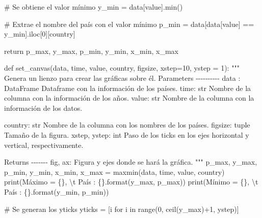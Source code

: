 \documentclass[
  letterpaper,
  DIV=11,
  numbers=noendperiod]{scrreprt}
\newenvironment{Shaded}{\begin{snugshade}}{\end{snugshade}}
\newcommand{\BuiltInTok}[1]{\textcolor[rgb]{0.00,0.23,0.31}{#1}}
\newcommand{\CharTok}[1]{\textcolor[rgb]{0.13,0.47,0.30}{#1}}
\newcommand{\CommentTok}[1]{\textcolor[rgb]{0.37,0.37,0.37}{#1}}
\newcommand{\ControlFlowTok}[1]{\textcolor[rgb]{0.00,0.23,0.31}{#1}}
\newcommand{\DecValTok}[1]{\textcolor[rgb]{0.68,0.00,0.00}{#1}}
\newcommand{\KeywordTok}[1]{\textcolor[rgb]{0.00,0.23,0.31}{#1}}
\newcommand{\NormalTok}[1]{\textcolor[rgb]{0.00,0.23,0.31}{#1}}
\newcommand{\OperatorTok}[1]{\textcolor[rgb]{0.37,0.37,0.37}{#1}}
\newcommand{\SpecialCharTok}[1]{\textcolor[rgb]{0.37,0.37,0.37}{#1}}
\newcommand{\StringTok}[1]{\textcolor[rgb]{0.13,0.47,0.30}{#1}}
\begin{document}
\begin{Shaded}
\begin{Highlighting}[]
    \CommentTok{\# Se obtiene el valor mínimo}
\NormalTok{    y\_min }\OperatorTok{=}\NormalTok{ data[value].}\BuiltInTok{min}\NormalTok{() }

    \CommentTok{\# Extrae el nombre del país con el valor mínimo}
\NormalTok{    p\_min }\OperatorTok{=}\NormalTok{ data[data[value] }\OperatorTok{==}\NormalTok{ y\_min].iloc[}\DecValTok{0}\NormalTok{][country]}

    \ControlFlowTok{return}\NormalTok{ p\_max, y\_max, p\_min, y\_min, x\_min, x\_max}

\KeywordTok{def}\NormalTok{ set\_canvas(data, time, value, country, figsize, xstep}\OperatorTok{=}\DecValTok{10}\NormalTok{, ystep }\OperatorTok{=} \DecValTok{1}\NormalTok{):}
    \CommentTok{"""}
\CommentTok{    Genera un lienzo para crear las gráficas sobre él.}
\CommentTok{    }
\CommentTok{    Parameters}
\CommentTok{    {-}{-}{-}{-}{-}{-}{-}{-}{-}{-}}
\CommentTok{    data : DataFrame}
\CommentTok{        Dataframe con la información de los países.}
\CommentTok{        }
\CommentTok{    time: str}
\CommentTok{        Nombre de la columna con la información de los años.}
\CommentTok{        }
\CommentTok{    value: str}
\CommentTok{        Nombre de la columna con la información de los datos.}

\CommentTok{    country: str}
\CommentTok{        Nombre de la columna con los nombres de los países.}
\CommentTok{        }
\CommentTok{    figsize: tuple}
\CommentTok{        Tamaño de la figura.}
\CommentTok{        }
\CommentTok{    xstep, ystep: int}
\CommentTok{        Paso de los ticks en los ejes horizontal y vertical, respectivamente.}

\CommentTok{    Returns}
\CommentTok{    {-}{-}{-}{-}{-}{-}{-}}
\CommentTok{    fig, ax: }
\CommentTok{        Figura y ejes donde se hará la gráfica.}
\CommentTok{    """}    
\NormalTok{    p\_max, y\_max, p\_min, y\_min, x\_min, x\_max }\OperatorTok{=}\NormalTok{ maxmin(data, time, value, country)}
    \BuiltInTok{print}\NormalTok{(}\StringTok{\textquotesingle{}Máximo = }\SpecialCharTok{\{\}}\StringTok{, }\CharTok{\textbackslash{}t}\StringTok{ País : }\SpecialCharTok{\{\}}\StringTok{\textquotesingle{}}\NormalTok{.}\BuiltInTok{format}\NormalTok{(y\_max, p\_max))}
    \BuiltInTok{print}\NormalTok{(}\StringTok{\textquotesingle{}Mínimo = }\SpecialCharTok{\{\}}\StringTok{, }\CharTok{\textbackslash{}t}\StringTok{ País : }\SpecialCharTok{\{\}}\StringTok{\textquotesingle{}}\NormalTok{.}\BuiltInTok{format}\NormalTok{(y\_min, p\_min))}
    
    \CommentTok{\# Se generan los yticks}
\NormalTok{    yticks }\OperatorTok{=}\NormalTok{ [i }\ControlFlowTok{for}\NormalTok{ i }\KeywordTok{in} \BuiltInTok{range}\NormalTok{(}\DecValTok{0}\NormalTok{, ceil(y\_max)}\OperatorTok{+}\DecValTok{1}\NormalTok{, ystep)]}


\end{Highlighting}
\end{Shaded}
\end{document}
